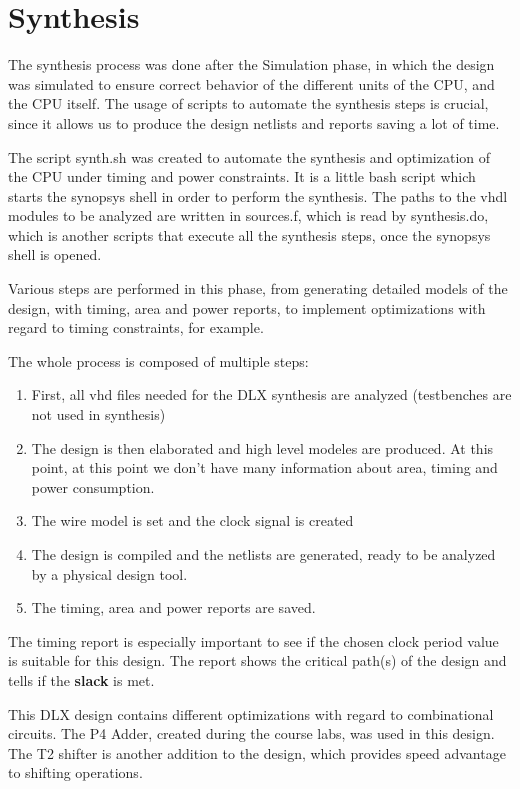 \chapter{Synthesis}
\label{Synthesis}

The synthesis process was done after the Simulation phase, in which the design was simulated to ensure correct behavior of the different units of the CPU, and the CPU itself.
The usage of scripts to automate the synthesis steps is crucial, since it allows us to produce the design netlists and reports saving a lot of time.

The script synth.sh was created to automate the synthesis and optimization of the CPU under timing and power constraints.
It is a little bash script which starts the synopsys shell in order to perform the synthesis. The paths to the vhdl modules to be analyzed are written in sources.f,
which is read by synthesis.do, which is another scripts that execute all the synthesis steps, once the synopsys shell is opened.

Various steps are performed in this phase, from generating detailed models of the design, with timing, area and power reports, to implement optimizations
with regard to timing constraints, for example.

The whole process is composed of multiple steps:

\begin{enumerate}
    \item First, all vhd files needed for the DLX synthesis are analyzed (testbenches are not used in synthesis)
    \item The design is then elaborated and high level modeles are produced. At this point, at this point we don't have many information about area, timing and power consumption.
    \item The wire model is set and the clock signal is created
    \item The design is compiled and the netlists are generated, ready to be analyzed by a physical design tool.
    \item The timing, area and power reports are saved.
\end{enumerate}

The timing report is especially important to see if the chosen clock period value is suitable for this design.
The report shows the critical path(s) of the design and tells if the \textbf{slack} is met.

This DLX design contains different optimizations with regard to combinational circuits.
The P4 Adder, created during the course labs, was used in this design. The T2 shifter is another addition to the design, which provides speed advantage to shifting operations.

